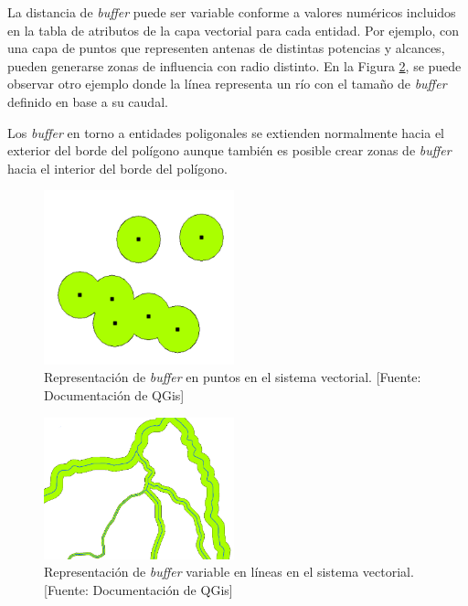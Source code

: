 La distancia de \textit{buffer} puede ser variable conforme a valores numéricos incluidos en la tabla de atributos de la capa vectorial para cada entidad. Por ejemplo, con una capa de puntos que representen antenas de distintas potencias y alcances, pueden generarse zonas de influencia con radio distinto. En la Figura \ref{fig:lineBuffer}, se puede observar otro ejemplo donde la línea representa un río con el tamaño de \textit{buffer} definido en base a su caudal.

Los \textit{buffer} en torno a entidades poligonales se extienden normalmente hacia el exterior del borde del polígono aunque también es posible crear zonas de \textit{buffer} hacia el interior del borde del polígono.

\begin{figure}[H]
    \centering
    \includegraphics[width=5.5cm]{point_buffer.png}
    \caption{Representación de \textit{buffer} en puntos en el sistema vectorial. [Fuente: Documentación de QGis]}
    \label{fig:pointBuffer}
\end{figure}

\begin{figure}[H]
    \centering
    \includegraphics[width=5.5cm]{variable_line_buffer.png}
    \caption{Representación de \textit{buffer} variable en líneas en el sistema vectorial. [Fuente: Documentación de QGis]}
    \label{fig:lineBuffer}
\end{figure}

